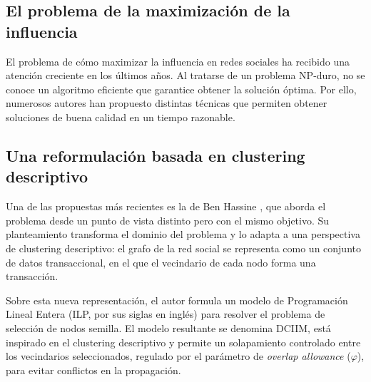 \documentclass[12pt,twoside,titlepage]{report}
\begin{document}
\subsection{El problema de la maximización de la influencia} \label{subsec:problema_im}

El problema de cómo maximizar la influencia en redes sociales ha recibido una atención creciente en los últimos años. Al tratarse de un problema NP-duro, no se conoce un algoritmo eficiente que garantice obtener la solución óptima. Por ello, numerosos autores han propuesto distintas técnicas que permiten obtener soluciones de buena calidad en un tiempo razonable.


\subsection{Una reformulación basada en clustering descriptivo} \label{subsec:dciim}

Una de las propuestas más recientes es la de Ben Hassine \cite{motaz}, que aborda el problema desde un punto de vista distinto pero con el mismo objetivo. Su planteamiento transforma el dominio del problema y lo adapta a una perspectiva de clustering descriptivo: el grafo de la red social se representa como un conjunto de datos transaccional, en el que el vecindario de cada nodo forma una transacción.

Sobre esta nueva representación, el autor formula un modelo de Programación Lineal Entera (ILP, por sus siglas en inglés) para resolver el problema de selección de nodos semilla. El modelo resultante se denomina DCIIM, está inspirado en el clustering descriptivo y permite un solapamiento controlado entre los vecindarios seleccionados, regulado por el parámetro de \textit{overlap allowance} ($\varphi$), para evitar conflictos en la propagación.

\end{document}
